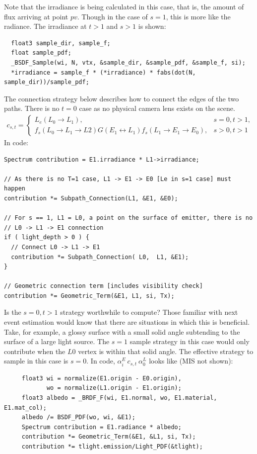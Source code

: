 \message{ !name(test.tex)}\documentclass{article}
\begin{document}
  Note that the irradiance is being calculated in this case, that is, the amount
  of flux arriving at point $pv$. Though in the case of $s=1$, this is more like
  the radiance. The irradiance at $t > 1$ and $s > 1$ is shown:

\begin{lstlisting}
  float3 sample_dir, sample_f;
  float sample_pdf;
  _BSDF_Sample(wi, N, vtx, &sample_dir, &sample_pdf, &sample_f, si);
  *irradiance = sample_f * (*irradiance) * fabs(dot(N, sample_dir))/sample_pdf;
\end{lstlisting}
  



  The connection strategy below describes how to connect the edges of the two
paths. There is no $t = 0$ case as no physical camera lens exists on the scene.
  \begin{align}
    c_{s, t} =
    \begin{cases}
      L_e(L_0 \rightarrow L_1), &s = 0, t > 1,\\
      f_s(L_0 \rightarrow L_1 \rightarrow L2) G(E_1 \leftrightarrow
      L_1) f_s(L_1 \rightarrow E_1 \rightarrow E_0), &s > 0, t > 1
    \end{cases}
  \end{align}
  In code:
  \begin{lstlisting}
Spectrum contribution = E1.irradiance * L1->irradiance;

// As there is no T=1 case, L1 -> E1 -> E0 [Le in s=1 case] must happen
contribution *= Subpath_Connection(L1, &E1, &E0);

// For s == 1, L1 = L0, a point on the surface of emitter, there is no
// L0 -> L1 -> E1 connection
if ( light_depth > 0 ) {
  // Connect L0 -> L1 -> E1
  contribution *= Subpath_Connection( L0,  L1, &E1);
}

// Geometric connection term [includes visibility check]
contribution *= Geometric_Term(&E1, L1, si, Tx);

  \end{lstlisting}


  
    Is the $s = 0, t > 1$ strategy worthwhile to compute? Those familiar with
next event estimation would know that there are situations in which this is
beneficial. Take, for example, a glossy surface with a small solid angle
subtending to the surface of a large light source. The $s=1$ sample strategy in
this case would only contribute when the $L0$ vertex is within that solid angle.
The effective strategy to sample in this case is $s = 0$. In code,
$\alpha_i^E\:c_{s,t}\:\alpha_0^L$ looks like (MIS not shown):
    \begin{lstlisting}
     float3 wi = normalize(E1.origin - E0.origin),
            wo = normalize(L1.origin - E1.origin);
     float3 albedo = _BRDF_F(wi, E1.normal, wo, E1.material, E1.mat_col);
     albedo /= BSDF_PDF(wo, wi, &E1);
     Spectrum contribution = E1.radiance * albedo;
     contribution *= Geometric_Term(&E1, &L1, si, Tx);
     contribution *= tlight.emission/Light_PDF(&tlight);
    \end{lstlisting}
    
\end{document}
